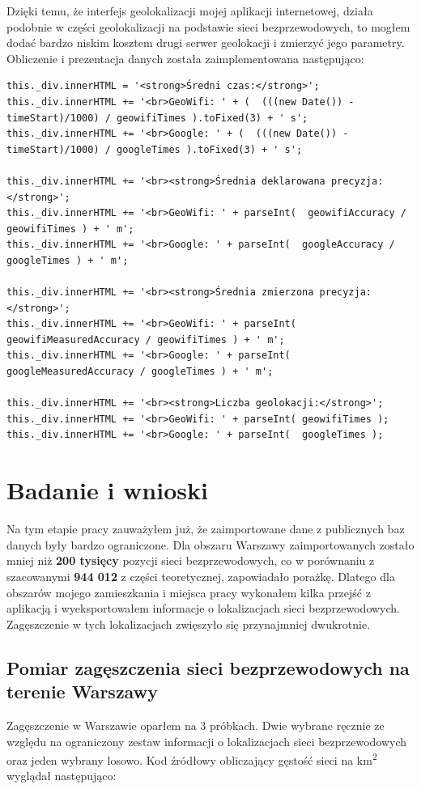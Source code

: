 Dzięki temu, że interfejs geolokalizacji mojej aplikacji internetowej, działa podobnie w części geolokalizacji na podstawie sieci bezprzewodowych, to mogłem dodać bardzo niskim kosztem drugi serwer geolokacji i zmierzyć jego parametry. Obliczenie i prezentacja danych została zaimplementowana następująco:
\begin{verbatim}
this._div.innerHTML = '<strong>Średni czas:</strong>';
this._div.innerHTML += '<br>GeoWifi: ' + (  (((new Date()) - timeStart)/1000) / geowifiTimes ).toFixed(3) + ' s';
this._div.innerHTML += '<br>Google: ' + (  (((new Date()) - timeStart)/1000) / googleTimes ).toFixed(3) + ' s';

this._div.innerHTML += '<br><strong>Średnia deklarowana precyzja:</strong>';
this._div.innerHTML += '<br>GeoWifi: ' + parseInt(  geowifiAccuracy / geowifiTimes ) + ' m';
this._div.innerHTML += '<br>Google: ' + parseInt(  googleAccuracy / googleTimes ) + ' m';

this._div.innerHTML += '<br><strong>Średnia zmierzona precyzja:</strong>';
this._div.innerHTML += '<br>GeoWifi: ' + parseInt(  geowifiMeasuredAccuracy / geowifiTimes ) + ' m';
this._div.innerHTML += '<br>Google: ' + parseInt(  googleMeasuredAccuracy / googleTimes ) + ' m';

this._div.innerHTML += '<br><strong>Liczba geolokacji:</strong>';
this._div.innerHTML += '<br>GeoWifi: ' + parseInt( geowifiTimes );
this._div.innerHTML += '<br>Google: ' + parseInt(  googleTimes );
\end{verbatim}


\section{Badanie i wnioski}
Na tym etapie pracy zauważyłem już, że zaimportowane dane z publicznych baz danych były bardzo ograniczone. Dla obszaru Warszawy zaimportowanych zostało mniej niż \textbf{200 tysięcy} pozycji sieci bezprzewodowych, co w porównaniu z szacowanymi \textbf{944 012} z części teoretycznej, zapowiadało porażkę. Dlatego dla obszarów mojego zamieszkania i miejsca pracy wykonałem kilka przejść z aplikacją i wyeksportowałem informacje o lokalizacjach sieci bezprzewodowych. Zagęszczenie w tych lokalizacjach zwięszyło się przynajmniej dwukrotnie.

\subsection{Pomiar zagęszczenia sieci bezprzewodowych na terenie Warszawy}
Zagęszczenie w Warszawie oparłem na 3 próbkach. Dwie wybrane ręcznie ze względu na ograniczony zestaw informacji o lokalizacjach sieci bezprzewodowych oraz jeden wybrany losowo. Kod źródłowy obliczający gęstość sieci na km\textsuperscript{2} wyglądał następująco:

